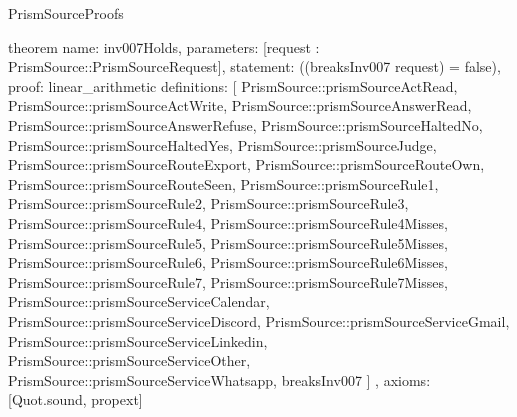 \begin{lexlean}{PrismSourceProofs}
\begin{semanticmodule}
theorem{
  name: inv007Holds,
  parameters: [request : PrismSource::PrismSourceRequest],
  statement: ((breaksInv007 request) = false),
  proof: linear_arithmetic{
    definitions: [
      PrismSource::prismSourceActRead,
      PrismSource::prismSourceActWrite,
      PrismSource::prismSourceAnswerRead,
      PrismSource::prismSourceAnswerRefuse,
      PrismSource::prismSourceHaltedNo,
      PrismSource::prismSourceHaltedYes,
      PrismSource::prismSourceJudge,
      PrismSource::prismSourceRouteExport,
      PrismSource::prismSourceRouteOwn,
      PrismSource::prismSourceRouteSeen,
      PrismSource::prismSourceRule1,
      PrismSource::prismSourceRule2,
      PrismSource::prismSourceRule3,
      PrismSource::prismSourceRule4,
      PrismSource::prismSourceRule4Misses,
      PrismSource::prismSourceRule5,
      PrismSource::prismSourceRule5Misses,
      PrismSource::prismSourceRule6,
      PrismSource::prismSourceRule6Misses,
      PrismSource::prismSourceRule7,
      PrismSource::prismSourceRule7Misses,
      PrismSource::prismSourceServiceCalendar,
      PrismSource::prismSourceServiceDiscord,
      PrismSource::prismSourceServiceGmail,
      PrismSource::prismSourceServiceLinkedin,
      PrismSource::prismSourceServiceOther,
      PrismSource::prismSourceServiceWhatsapp,
      breaksInv007
    ]
  },
  axioms: [Quot.sound, propext]
}
\end{semanticmodule}
\end{lexlean}
